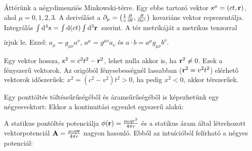    Áttérünk a négydimenziós Minkowski-térre. Egy ebbe tartozó vektor $\mathsf{x}^\mu=(ct,\mathbf{r})$, ahol $\mu=0,1,2,3$. A deriválást a $\partial_\mu=\left(\frac{1}{c}\frac{\partial }{\partial t}, \frac{\partial }{\partial x^i}\right)$ kovariáns vektor reprezentálja. Integrálás $\int\limits_{}^{}\mathrm{d}^4\mathsf{x}=\int\limits_{}^{}\mathrm{d}(ct)\int\limits_{}^{}\mathrm{d}^3\mathbf{r}\,$ szerint. A tér metrikáját a 
   metrikus tenzorral írjuk le. Ezzel: $a_\mu=g_{\mu\nu}a^\nu$, $a^\mu=g^{\mu\nu}a_\nu$ és $a\cdot b=a^\mu g_{\mu\nu}b^\nu$. 
   
   Egy vektor hossza, $\mathsf{x}^2=c^2t^2-\mathbf{r}^2$, lehet nulla akkor is, ha $\mathbf{r}^2\neq 0$. Ezek a fényszerű vektorok. Az origóból fénysebességnél lassabban ($\mathbf{r}^2=v^2t^2$) elérhető vektorok időszerűek: $x^2=(c^2-v^2)t^2>0$, ha pedig $x^2<0$, akkor térszerűek. 
   
   Egy ponttöltés töltéssűrűségéből és áramsűrűségéből is képezhetünk egy négyesvektort:
   Ekkor a kontinuitási egyenlet egyszerű alakú:
   
   A statikus pontöltés potenciálja $\phi(\mathbf{r})=\frac{\mu_0qc^2}{4\pi r}$ és a statikus áram által létrehozott vektorpotenciál $\mathbf{A}=\frac{\mu_0q\mathbf{v}}{4\pi r}$ nagyon hasonló. Ebből az intuícióból felírható a négyes potenciál:
   
